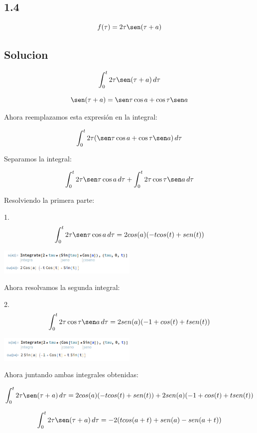 \documentclass{article}
\begin{document}
\subsection*{1.4}

\[f(\tau) = 2\tau\sen(\tau+a)\]

\subsection*{Solucion}

\[ \int_{0}^{t} 2\tau \sen(\tau+a) \, d\tau \]

\[ \sen(\tau+a) = \sen\tau\cos a + \cos\tau\sen a \]

Ahora reemplazamos esta expresión en la integral:

\[ \int_{0}^{t} 2\tau (\sen\tau\cos a + \cos\tau\sen a) \, d\tau \]

Separamos la integral:

\[ \int_{0}^{t} 2\tau\sen\tau\cos a \, d\tau + \int_{0}^{t} 2\tau\cos\tau\sen a \, d\tau \]

Resolviendo la primera parte:

1. \[ \int_{0}^{t} 2\tau\sen\tau\cos a \, d\tau = 2cos(a)(-tcos(t) + sen(t))\]

\begin{center}
    \includegraphics[width=0.5\textwidth]{./image6.png}
\end{center}

Ahora resolvamos la segunda integral:

2. \[ \int_{0}^{t} 2\tau\cos\tau\sen a \, d\tau = 2sen(a)(-1+cos(t) + tsen(t))\]

\begin{center}
    \includegraphics[width=0.5\textwidth]{./image7.png}
\end{center}

Ahora juntando ambas integrales obtenidas:

\[ \int_{0}^{t} 2\tau \sen(\tau+a) \, d\tau = 2cos(a)(-tcos(t) + sen(t)) +  2sen(a)(-1+cos(t) + tsen(t))\]

\[ \int_{0}^{t} 2\tau \sen(\tau+a) \, d\tau = -2(t cos(a+t) + sen(a) -sen(a+t))\]
\end{document}
